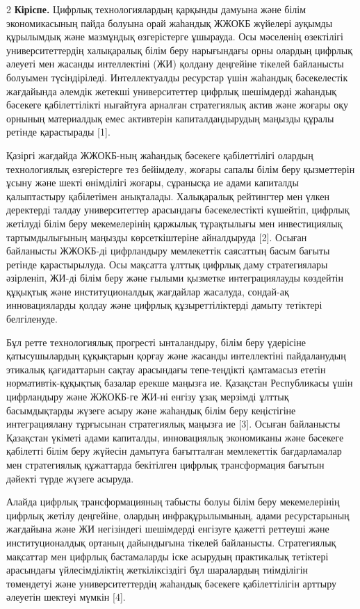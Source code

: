 \begin{multicols}{2}
{\bfseries Кіріспе.} Цифрлық технологиялардың қарқынды дамуына және білім
экономикасының пайда болуына орай жаһандық ЖЖОКБ жүйелері ауқымды
құрылымдық және мазмұндық өзгерістерге ұшырауда. Осы мәселенің
өзектілігі университеттердің халықаралық білім беру нарығындағы орны
олардың цифрлық әлеуеті мен жасанды интеллектіні (ЖИ) қолдану деңгейіне
тікелей байланысты болуымен түсіндіріледі. Интеллектуалды ресурстар үшін
жаһандық бәсекелестік жағдайында әлемдік жетекші университеттер цифрлық
шешімдерді жаһандық бәсекеге қабілеттілікті нығайтуға арналған
стратегиялық актив және жоғары оқу орнының материалдық емес активтерін
капиталдандырудың маңызды құралы ретінде қарастырады {[}1{]}.

Қазіргі жағдайда ЖЖОКБ-ның жаһандық бәсекеге қабілеттілігі олардың
технологиялық өзгерістерге тез бейімделу, жоғары сапалы білім беру
қызметтерін ұсыну және шекті өнімділігі жоғары, сұранысқа ие адами
капиталды қалыптастыру қабілетімен анықталады. Халықаралық рейтингтер
мен үлкен деректерді талдау университеттер арасындағы бәсекелестікті
күшейтіп, цифрлық жетілуді білім беру мекемелерінің қаржылық тұрақтылығы
мен инвестициялық тартымдылығының маңызды көрсеткіштеріне айналдыруда
{[}2{]}. Осыған байланысты ЖЖОКБ-ді цифрландыру мемлекеттік саясаттың
басым бағыты ретінде қарастырылуда. Осы мақсатта ұлттық цифрлық даму
стратегиялары әзірленіп, ЖИ-ді білім беру және ғылыми қызметке
интеграциялауды көздейтін құқықтық және институционалдық жағдайлар
жасалуда, сондай-ақ инновацияларды қолдау және цифрлық құзыреттіліктерді
дамыту тетіктері белгіленуде.

Бұл ретте технологиялық прогресті ынталандыру, білім беру үдерісіне
қатысушылардың құқықтарын қорғау және жасанды интеллектіні пайдаланудың
этикалық қағидаттарын сақтау арасындағы тепе-теңдікті қамтамасыз ететін
нормативтік-құқықтық базалар ерекше маңызға ие. Қазақстан Республикасы
үшін цифрландыру және ЖЖОКБ-ге ЖИ-ні енгізу ұзақ мерзімді ұлттық
басымдықтарды жүзеге асыру және жаһандық білім беру кеңістігіне
интеграциялану тұрғысынан стратегиялық маңызға ие {[}3{]}. Осыған
байланысты Қазақстан үкіметі адами капиталды, инновациялық экономиканы
және бәсекеге қабілетті білім беру жүйесін дамытуға бағытталған
мемлекеттік бағдарламалар мен стратегиялық құжаттарда бекітілген цифрлық
трансформация бағытын дәйекті түрде жүзеге асыруда.

Алайда цифрлық трансформацияның табысты болуы білім беру мекемелерінің
цифрлық жетілу деңгейіне, олардың инфрақұрылымының, адами ресурстарының
жағдайына және ЖИ негізіндегі шешімдерді енгізуге қажетті реттеуші және
институционалдық ортаның дайындығына тікелей байланысты. Стратегиялық
мақсаттар мен цифрлық бастамаларды іске асырудың практикалық тетіктері
арасындағы үйлесімділіктің жеткіліксіздігі бұл шаралардың тиімділігін
төмендетуі және университеттердің жаһандық бәсекеге қабілеттілігін
арттыру әлеуетін шектеуі мүмкін {[}4{]}.


\end{multicols}
